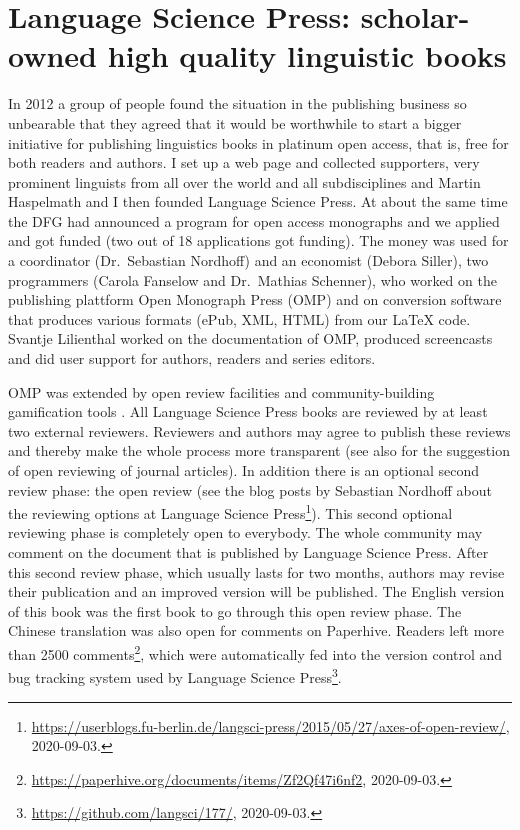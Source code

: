 \section*{Language Science Press: scholar-owned high quality linguistic books}

In 2012 a group of people found the situation in the publishing business so unbearable that they
agreed that it would be worthwhile to start a bigger initiative for publishing linguistics books in
platinum open access, that is, free for both readers and authors. I set up a web page and collected
supporters, very prominent linguists from all over the world and all subdisciplines and Martin
Haspelmath and I then founded Language Science Press. At about the same time the DFG had announced
a program for open access monographs and we applied \citep{MH2013a} and got funded (two out of 18 applications got
funding). The money was used for a coordinator (Dr.\ Sebastian Nordhoff) and an economist (Debora
Siller), two programmers (Carola Fanselow and Dr.\ Mathias Schenner), who worked on the publishing
plattform Open Monograph Press (OMP) and on conversion software that produces various formats (ePub, XML,
HTML) from our \LaTeX{} code. Svantje Lilienthal worked on the documentation of OMP, produced
screencasts and did user support for authors, readers and series editors.

OMP was extended by open review facilities and community-building gamification tools
\citep{MuellerOA,MH2013a}. All Language Science Press books are reviewed by at least two external
reviewers. Reviewers and authors may agree to publish these reviews and thereby make the whole
process more transparent (see also  for the suggestion of open reviewing of journal
articles). In addition there is an optional second review phase: the open
review (see the blog posts by Sebastian Nordhoff about the reviewing options at Language Science
Press\footnote{%
\url{https://userblogs.fu-berlin.de/langsci-press/2015/05/27/axes-of-open-review/}, 2020-09-03.
}). This second optional reviewing phase is completely open to everybody. The whole community may comment on the document
that is published by Language Science Press. After this second review phase, which usually lasts for
two months, authors may revise their publication and an improved version will be published. The
English version of this book was the first book to go through this open review phase. The Chinese
translation was also open for comments on Paperhive. Readers left more than 2500 comments\footnote{%
\url{https://paperhive.org/documents/items/Zf2Qf47i6nf2}, 2020-09-03.}, which were automatically fed into the version control
and bug tracking system used by Language Science Press\footnote{%
\url{https://github.com/langsci/177/}, 2020-09-03.
}.

